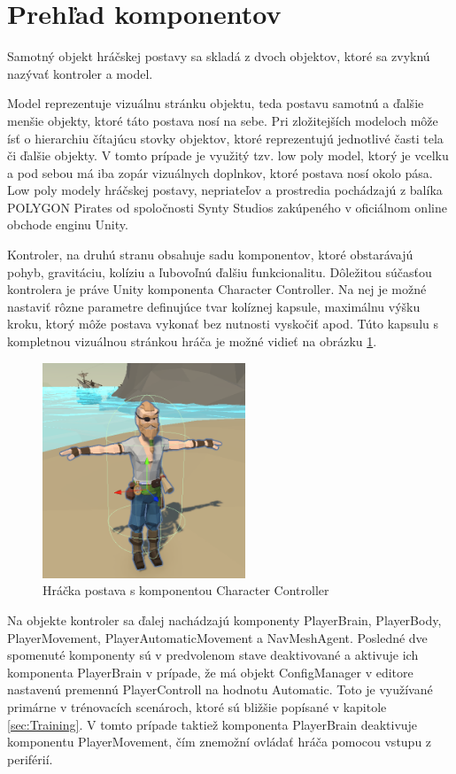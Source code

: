 \documentclass[slovak, master]{diploma}
\begin{document}
\section{Prehľad komponentov}
\label{sec:PlayerComponentOverview} 
Samotný objekt hráčskej postavy sa skladá z dvoch objektov, ktoré sa zvyknú nazývať kontroler a model. 

Model reprezentuje vizuálnu stránku objektu, teda postavu samotnú a ďalšie menšie objekty, ktoré táto postava nosí na sebe. Pri zložitejších modeloch môže ísť o hierarchiu čítajúcu stovky objektov, ktoré reprezentujú jednotlivé časti tela či ďalšie objekty. V tomto prípade je využitý tzv. low poly model, ktorý je vcelku a pod sebou má iba zopár vizuálnych doplnkov, ktoré postava nosí okolo pása. Low poly modely hráčskej postavy, nepriateľov a prostredia pochádzajú z balíka POLYGON Pirates \cite{Synty} od spoločnosti Synty Studios zakúpeného v oficiálnom online obchode enginu Unity.

Kontroler, na druhú stranu obsahuje sadu komponentov, ktoré obstarávajú pohyb, gravitáciu, kolíziu a ľubovoľnú ďalšiu funkcionalitu. Dôležitou súčasťou kontrolera je práve Unity komponenta Character Controller. Na nej je možné nastaviť rôzne parametre definujúce tvar kolíznej kapsule, maximálnu výšku kroku, ktorý môže postava vykonať bez nutnosti vyskočiť apod. Túto kapsulu s kompletnou vizuálnou stránkou hráča je možné vidieť na obrázku \ref{pic:PlayerController}.

\begin{figure}[!htbp]
	\centering
	\includegraphics[width=0.54\textwidth]{Figures/controller.png}
	\caption{Hráčka postava s komponentou Character Controller}
	\label{pic:PlayerController}
\end{figure}

Na objekte kontroler sa ďalej nachádzajú komponenty PlayerBrain, PlayerBody, PlayerMovement, PlayerAutomaticMovement a NavMeshAgent. Posledné dve spomenuté komponenty sú v predvolenom stave deaktivované a aktivuje ich komponenta PlayerBrain v prípade, že má objekt ConfigManager v editore nastavenú premennú PlayerControll na hodnotu Automatic. Toto je využívané primárne v trénovacích scenároch, ktoré sú bližšie popísané v kapitole \ref{sec:Training}. V tomto prípade taktiež komponenta PlayerBrain deaktivuje komponentu PlayerMovement, čím znemožní ovládať hráča pomocou vstupu z periférií. 
\end{document}
